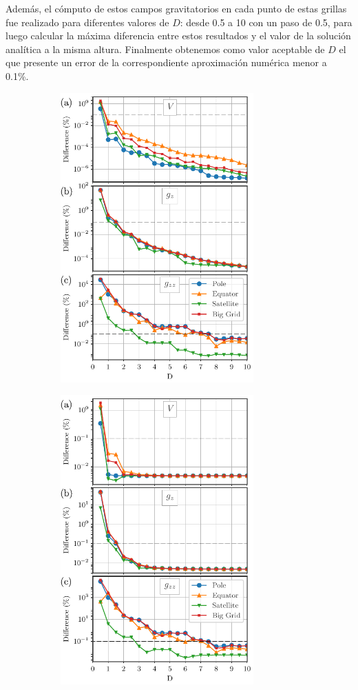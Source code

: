 \documentclass[a4paper,10pt]{article}
\begin{document}
Además, el cómputo de estos campos gravitatorios en cada punto de estas grillas fue realizado para diferentes valores de $D$: desde 0.5 a 10 con un paso de 0.5, para luego calcular la máxima diferencia entre estos resultados y el valor de la solución analítica a la misma altura.
Finalmente obtenemos como valor aceptable de $D$ el que presente un error de la correspondiente aproximación numérica menor a 0.1\%.

\begin{figure}[b!]
    \begin{subfigure}[t]{0.5\textwidth}
    \centering
    \includegraphics[height=30em]{../manuscript/figures/linear-D-thin.pdf}
    \caption{}
    \label{fig:D-linear-thin}
    \end{subfigure}
    \quad
    \begin{subfigure}[t]{0.5\textwidth}
    \centering
    \includegraphics[height=30em]{../manuscript/figures/exponential-D-thin.pdf}

\end{subfigure}
\end{figure}
\end{document}
